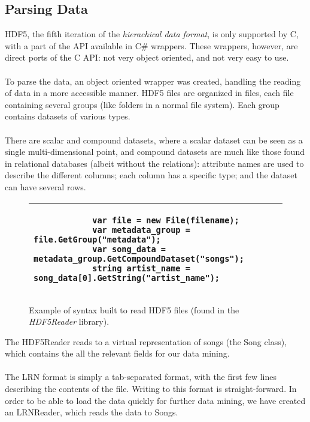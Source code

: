 \subsection{Parsing Data}
\label{sec:preprocessing_parsing}

HDF5, the fifth iteration of the \emph{hierachical data format}, is only supported by C, with a part of the API available
in C\# wrappers. These wrappers, however, are direct ports of the C API: not very object oriented, and not very easy to use.
\\\\
To parse the data, an object oriented wrapper was created, handling the reading of data in a more accessible manner. HDF5 files
are organized in files, each file containing several groups (like folders in a normal file system). Each group contains
datasets of various types.
\\\\
There are scalar and compound datasets, where a scalar dataset can be seen as a single multi-dimensional point, and compound
datasets are much like those found in relational databases (albeit without the relations): attribute names are used to describe
the different columns; each column has a specific type; and the dataset can have several rows.

\begin{figure}[h!]
	\begin{tabular}{|p{\textwidth}|}
		\hline
		\begin{verbatim}
			var file = new File(filename);
			var metadata_group = file.GetGroup("metadata");
			var song_data = metadata_group.GetCompoundDataset("songs");
			string artist_name = song_data[0].GetString("artist_name");
		\end{verbatim} \\
		\hline
	\end{tabular}
	\caption{Example of syntax built to read HDF5 files (found in the \emph{HDF5Reader} library).}
\end{figure}
\noindent
The HDF5Reader reads to a virtual representation of songs (the Song class), which contains the all the relevant fields for our data
mining.
\\\\
The LRN format is simply a tab-separated format, with the first few lines describing the contents of the file. Writing to this format
is straight-forward. In order to be able to load the data quickly for further data mining, we have created an LRNReader, which reads
the data to Songs.
